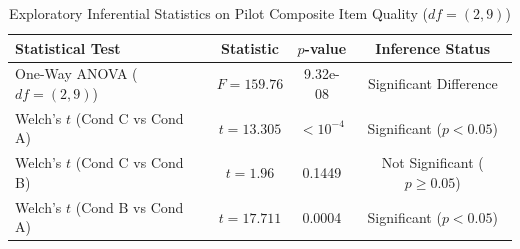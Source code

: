 \begin{table}[ht]
\centering
\caption{Exploratory Inferential Statistics on Pilot Composite Item Quality ($df = (2, 9)$)}
\label{tab:inferential_stats}
\begin{tabular}{lccc}
\hline
\textbf{Statistical Test} & \textbf{Statistic} & \textbf{$p$-value} & \textbf{Inference Status} \\
\hline
One-Way ANOVA ($df = (2, 9)$) & $F = 159.76$ & 9.32e-08 & Significant Difference \\
Welch's $t$ (Cond C vs Cond A) & $t = 13.305$ & $< 10^{-4}$ & Significant ($p < 0.05$) \\
Welch's $t$ (Cond C vs Cond B) & $t = 1.96$ & 0.1449 & Not Significant ($p \ge 0.05$) \\
Welch's $t$ (Cond B vs Cond A) & $t = 17.711$ & 0.0004 & Significant ($p < 0.05$) \\
\hline
\end{tabular}
\end{table}
